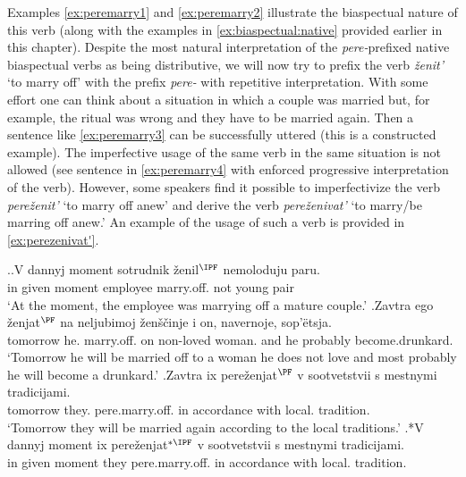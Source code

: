 Examples \ref{ex:peremarry1} and \ref{ex:peremarry2} illustrate the biaspectual nature of this verb (along with the examples in \ref{ex:biaspectual:native} provided earlier in this chapter). Despite the most natural interpretation of the \textit{pere-}prefixed native biaspectual verbs as being distributive, we will now try to prefix the verb \textit{\v{z}enit'} `to marry off' with the prefix \textit{pere-} with repetitive interpretation. With some effort one can think about a situation in which a couple was married but, for example, the ritual was wrong and they have to be married again. Then a sentence like \ref{ex:peremarry3} can be successfully uttered (this is a constructed example). The imperfective usage of the same verb in the same situation is not allowed (see sentence in \ref{ex:peremarry4} with enforced progressive interpretation of the verb). However, some speakers find it possible to imperfectivize the verb \textit{pere\v{z}enit'} `to marry off anew' and derive the verb \textit{pere\v{z}enivat'} `to marry/be marring off anew.' An example of the usage of such a verb is provided in \ref{ex:perezenivat'}. 

\ex.\ag.\label{ex:peremarry1}V dannyj moment sotrudnik \v{z}enil$^{\IPF}$ nemoloduju paru.\\
in given moment employee marry.off. {not young} pair\\
\vspace{0.5em}
`At the moment, the employee was marrying off a mature couple.'
\bg.\label{ex:peremarry2}Zavtra ego \v{z}enjat$^{\PF}$ na neljubimoj \v{z}en\v{s}\v{c}inje i on, navernoje, sop'\"{e}tsja.\\
tomorrow he. marry.off. on non-loved woman. and he probably {become.drunkard.}\\
\vspace{0.5em}
`Tomorrow he will be married off to a woman he does not love and most probably he will become a drunkard.'
\bg.\label{ex:peremarry3}Zavtra ix pere\v{z}enjat$^{\PF}$ v sootvetstvii s mestnymi tradicijami.\\
tomorrow they. pere.marry.off. in accordance with local. tradition.\\
\vspace{0.5em}
`Tomorrow they will be married again according to the local traditions.'
\bg.*V dannyj moment ix pere\v{z}enjat$^{*{\IPF}}$ v sootvetstvii s mestnymi tradicijami.\label{ex:peremarry4}\\
in given moment they pere.marry.off. in accordance with local. tradition.\\

